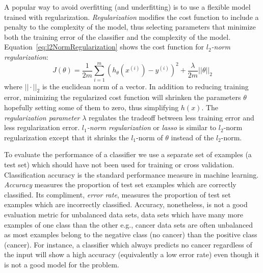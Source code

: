 A popular way to avoid overfitting (and underfitting) is to use a flexible model trained with regularization. \emph{Regularization} modifies the cost function to include a penalty to the complexity of the model, thus selecting parameters that minimize both the training error of the classifier and the complexity of the model. Equation~\ref{eq:l2NormRegularization} shows the cost function for \emph{$l_2$-norm regularization}:
\begin{equation}
	J(\theta) =  \frac{1}{2m}\sum_{i=1}^m(h_\theta(x^{(i)}) - y^{(i)})^2 + \frac{\lambda}{2m} ||\theta||_2
	\label{eq:l2NormRegularization}
\end{equation}
where $||\cdot||_2$ is the euclidean norm of a vector. In addition to reducing training error, minimizing the regularized cost function will shrinken the parameters $\theta$ hopefully setting some of them to zero, thus simplifying $h(x)$. The \emph{regularization parameter} $\lambda$ regulates the tradeoff between less training error and less regularization error. \emph{$l_1$-norm regularization} or \emph{lasso} is similar to $l_2$-norm regularization except that it shrinks the $l_1$-norm of $\theta$ instead of the $l_2$-norm.

To evaluate the performance of a classifier we use a separate set of examples (a test set) which should have not been used for training or cross validation. Classification accuracy is the standard performance measure in machine learning. \emph{Accuracy} measures the proportion of test set examples which are correctly classified. Its compliment, \emph{error rate}, measures the proportion of test set examples which are incorrectly classified. Accuracy, nonetheless, is not a good evaluation metric for unbalanced data sets, data sets which have many more examples of one class than the other e.g., cancer data sets are often unbalanced as most examples belong to the negative class (no cancer) than the positive class (cancer). For instance, a classifier which always predicts no cancer regardless of the input will show a high accuracy (equivalently a low error rate) even though it is not a good model for the problem.

